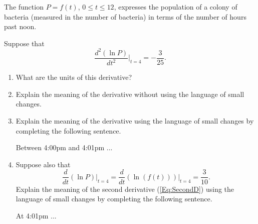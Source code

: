\documentclass{ximera}
\begin{document}
\begin{question}  \label{Qghldfdfgng}
The function $P=f(t)$, $0\leq t \leq 12$, expresses the population of a colony of bacteria (measured in the number of bacteria) in terms of the number of hours past noon.

Suppose that
\begin{equation}
   \frac{d^2 \left(  \ln P \right)}{dt^2} \Big|_{t=4} =  -\frac{3}{25} .  \label{Eq:SecondD}
\end{equation}


\begin{enumerate}
\item What are the units of this derivative?

\item Explain the meaning of the derivative without using the language of small changes.

\item Explain the meaning of the derivative using the language of small changes by completing the following sentence.

Between 4:00pm and 4:01pm  ...

\item Suppose also that
\[
   \frac{d}{dt} \left(  \ln P \right)\Big|_{t=4} = \frac{d}{dt} \left(  \ln (f(t)) \right)\Big|_{t=4}  = \frac{3}{10} .
\]
Explain the meaning of the second derivative (\ref{Eq:SecondD}) using the language of small changes by completing the following sentence.

At 4:01pm  ...

\end{enumerate}
\end{question}
\end{document}
